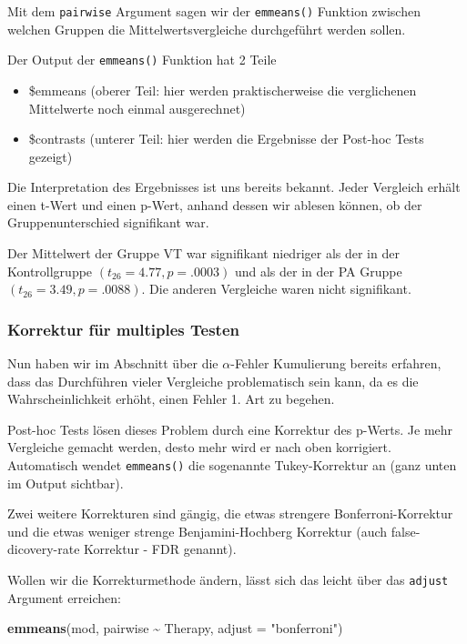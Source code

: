 \documentclass[
]{book}
\newenvironment{Shaded}{\begin{snugshade}}{\end{snugshade}}
\newcommand{\AttributeTok}[1]{\textcolor[rgb]{0.13,0.29,0.53}{#1}}
\newcommand{\FunctionTok}[1]{\textcolor[rgb]{0.13,0.29,0.53}{\textbf{#1}}}
\newcommand{\NormalTok}[1]{#1}
\newcommand{\SpecialCharTok}[1]{\textcolor[rgb]{0.81,0.36,0.00}{\textbf{#1}}}
\newcommand{\StringTok}[1]{\textcolor[rgb]{0.31,0.60,0.02}{#1}}
\providecommand{\tightlist}{%
  \setlength{\itemsep}{0pt}\setlength{\parskip}{0pt}}
\begin{document}
Mit dem \texttt{pairwise} Argument sagen wir der \texttt{emmeans()} Funktion zwischen welchen Gruppen die Mittelwertsvergleiche durchgeführt werden sollen.

Der Output der \texttt{emmeans()} Funktion hat 2 Teile

\begin{itemize}
\tightlist
\item
  \$emmeans (oberer Teil: hier werden praktischerweise die verglichenen Mittelwerte noch einmal ausgerechnet)
\item
  \$contrasts (unterer Teil: hier werden die Ergebnisse der Post-hoc Tests gezeigt)
\end{itemize}

Die Interpretation des Ergebnisses ist uns bereits bekannt. Jeder Vergleich erhält einen t-Wert und einen p-Wert, anhand dessen wir ablesen können, ob der Gruppenunterschied signifikant war.

Der Mittelwert der Gruppe VT war signifikant niedriger als der in der Kontrollgruppe \((t_{26}=4.77,p=.0003)\) und als der in der PA Gruppe \((t_{26}=3.49,p=.0088)\). Die anderen Vergleiche waren nicht signifikant.

\subsubsection{Korrektur für multiples Testen}\label{korrektur-fuxfcr-multiples-testen}

Nun haben wir im Abschnitt über die \(\alpha\)-Fehler Kumulierung bereits erfahren, dass das Durchführen vieler Vergleiche problematisch sein kann, da es die Wahrscheinlichkeit erhöht, einen Fehler 1. Art zu begehen.

Post-hoc Tests lösen dieses Problem durch eine Korrektur des p-Werts. Je mehr Vergleiche gemacht werden, desto mehr wird er nach oben korrigiert. Automatisch wendet \texttt{emmeans()} die sogenannte Tukey-Korrektur an (ganz unten im Output sichtbar).

Zwei weitere Korrekturen sind gängig, die etwas strengere Bonferroni-Korrektur und die etwas weniger strenge Benjamini-Hochberg Korrektur (auch false-dicovery-rate Korrektur - FDR genannt).

Wollen wir die Korrekturmethode ändern, lässt sich das leicht über das \texttt{adjust} Argument erreichen:

\begin{Shaded}
\begin{Highlighting}[]
\FunctionTok{emmeans}\NormalTok{(mod, pairwise }\SpecialCharTok{\textasciitilde{}}\NormalTok{ Therapy, }\AttributeTok{adjust =} \StringTok{"bonferroni"}\NormalTok{)}
\end{Highlighting}
\end{Shaded}
\end{document}
